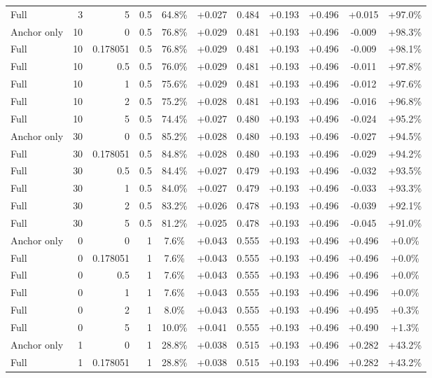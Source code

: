 \begin{table}[htbp]
\begin{tabular}{lrrrccccccc}
Full & 3 & 5 & 0.5 & 64.8\% & +0.027 & 0.484 & +0.193 & +0.496 & +0.015 & +97.0\% \\
Anchor only & 10 & 0 & 0.5 & 76.8\% & +0.029 & 0.481 & +0.193 & +0.496 & -0.009 & +98.3\% \\
Full & 10 & 0.178051 & 0.5 & 76.8\% & +0.029 & 0.481 & +0.193 & +0.496 & -0.009 & +98.1\% \\
Full & 10 & 0.5 & 0.5 & 76.0\% & +0.029 & 0.481 & +0.193 & +0.496 & -0.011 & +97.8\% \\
Full & 10 & 1 & 0.5 & 75.6\% & +0.029 & 0.481 & +0.193 & +0.496 & -0.012 & +97.6\% \\
Full & 10 & 2 & 0.5 & 75.2\% & +0.028 & 0.481 & +0.193 & +0.496 & -0.016 & +96.8\% \\
Full & 10 & 5 & 0.5 & 74.4\% & +0.027 & 0.480 & +0.193 & +0.496 & -0.024 & +95.2\% \\
Anchor only & 30 & 0 & 0.5 & 85.2\% & +0.028 & 0.480 & +0.193 & +0.496 & -0.027 & +94.5\% \\
Full & 30 & 0.178051 & 0.5 & 84.8\% & +0.028 & 0.480 & +0.193 & +0.496 & -0.029 & +94.2\% \\
Full & 30 & 0.5 & 0.5 & 84.4\% & +0.027 & 0.479 & +0.193 & +0.496 & -0.032 & +93.5\% \\
Full & 30 & 1 & 0.5 & 84.0\% & +0.027 & 0.479 & +0.193 & +0.496 & -0.033 & +93.3\% \\
Full & 30 & 2 & 0.5 & 83.2\% & +0.026 & 0.478 & +0.193 & +0.496 & -0.039 & +92.1\% \\
Full & 30 & 5 & 0.5 & 81.2\% & +0.025 & 0.478 & +0.193 & +0.496 & -0.045 & +91.0\% \\
Anchor only & 0 & 0 & 1 & 7.6\% & +0.043 & 0.555 & +0.193 & +0.496 & +0.496 & +0.0\% \\
Full & 0 & 0.178051 & 1 & 7.6\% & +0.043 & 0.555 & +0.193 & +0.496 & +0.496 & +0.0\% \\
Full & 0 & 0.5 & 1 & 7.6\% & +0.043 & 0.555 & +0.193 & +0.496 & +0.496 & +0.0\% \\
Full & 0 & 1 & 1 & 7.6\% & +0.043 & 0.555 & +0.193 & +0.496 & +0.496 & +0.0\% \\
Full & 0 & 2 & 1 & 8.0\% & +0.043 & 0.555 & +0.193 & +0.496 & +0.495 & +0.3\% \\
Full & 0 & 5 & 1 & 10.0\% & +0.041 & 0.555 & +0.193 & +0.496 & +0.490 & +1.3\% \\
Anchor only & 1 & 0 & 1 & 28.8\% & +0.038 & 0.515 & +0.193 & +0.496 & +0.282 & +43.2\% \\
Full & 1 & 0.178051 & 1 & 28.8\% & +0.038 & 0.515 & +0.193 & +0.496 & +0.282 & +43.2\% \\

\end{tabular}
\end{table}
